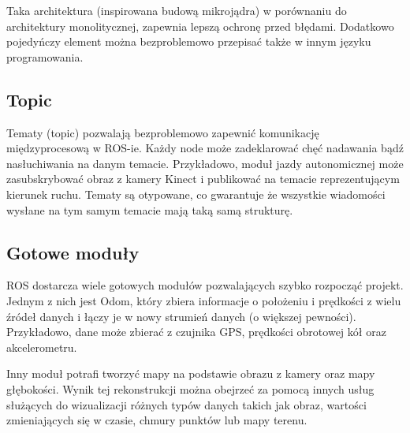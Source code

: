 Taka architektura (inspirowana budową mikrojądra) w porównaniu do architektury monolitycznej, zapewnia lepszą ochronę przed błędami. Dodatkowo pojedyńczy element można
bezproblemowo przepisać także w innym języku programowania.
\subsection{Topic}
Tematy (topic) pozwalają bezproblemowo zapewnić komunikację międzyprocesową
w ROS-ie. Każdy node może zadeklarować chęć nadawania bądź nasłuchiwania na
danym temacie. Przykładowo, moduł jazdy autonomicznej może zasubskrybować
obraz z kamery Kinect i publikować na temacie reprezentującym kierunek ruchu.
Tematy są otypowane, co gwarantuje że wszystkie wiadomości wysłane na tym
samym temacie mają taką samą strukturę.
\subsection{Gotowe moduły}
ROS dostarcza wiele gotowych modułów pozwalających szybko rozpocząć projekt.
Jednym z nich jest Odom, który zbiera informacje o położeniu i prędkości 
z wielu źródeł danych i łączy je w nowy strumień danych (o większej pewności). Przykładowo, 
dane może zbierać z czujnika GPS, prędkości obrotowej kół oraz akcelerometru.

Inny moduł potrafi tworzyć mapy na podstawie obrazu z kamery oraz mapy głębokości.
Wynik tej rekonstrukcji można obejrzeć za pomocą innych usług służących do 
wizualizacji różnych typów danych takich jak obraz, wartości zmieniających się
w czasie, chmury punktów lub mapy terenu.

